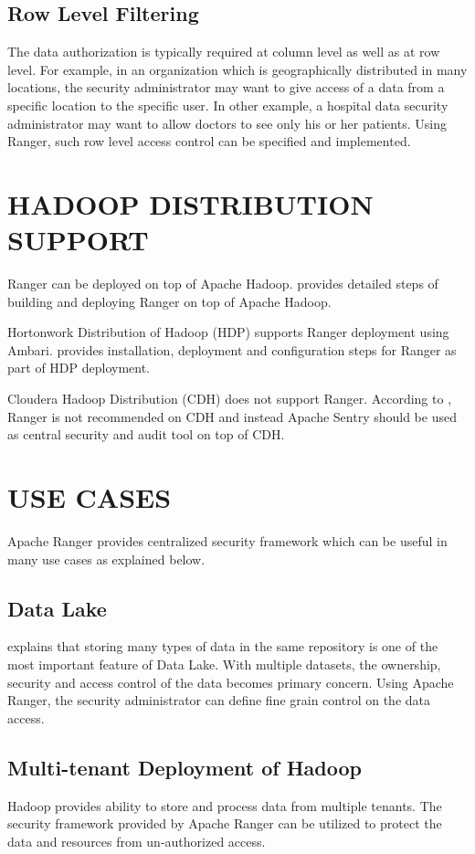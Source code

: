\documentclass[9pt,twocolumn,twoside]{../../styles/osajnl}
\begin{document}
\subsection{Row Level Filtering}
The data authorization is typically required at column level as well as at row
level. For example, in an organization which is geographically distributed in
 many locations, the security administrator may want to give access of a data
  from a specific location to the specific user. In other example, a
  hospital data security administrator may want to allow doctors to see
  only his or her patients. Using Ranger, such row level access control can
  be specified and implemented.

\section{HADOOP DISTRIBUTION SUPPORT}
Ranger can be deployed on top of Apache Hadoop.
\cite{www-ranger-on-apache-hadoop} provides detailed steps of building and
deploying Ranger on top of Apache Hadoop.

Hortonwork Distribution of Hadoop (HDP) supports Ranger deployment using
Ambari. \cite{www-ranger-on-hdp} provides installation, deployment and
configuration steps for Ranger as part of HDP deployment.

Cloudera Hadoop Distribution (CDH) does not support Ranger. According to
\cite{www-ranger-on-cdh}, Ranger is not recommended on CDH and instead Apache
Sentry should be used as central security and audit tool on top of CDH.

\section{USE CASES}
Apache Ranger provides centralized security framework which can be useful in
many use cases as explained below.

\subsection{Data Lake}
\cite{data-lake-whitepaper} explains that storing many types of data in the
same repository is one of the most important feature of Data Lake. With
multiple datasets, the ownership, security and access control of the data
becomes primary concern. Using Apache Ranger, the security administrator can
define fine grain control on the data access.

\subsection{Multi-tenant Deployment of Hadoop}
Hadoop provides ability to store and process data from multiple
tenants. The security framework provided by Apache Ranger can be utilized to
protect the data and resources from un-authorized access.
\end{document}
